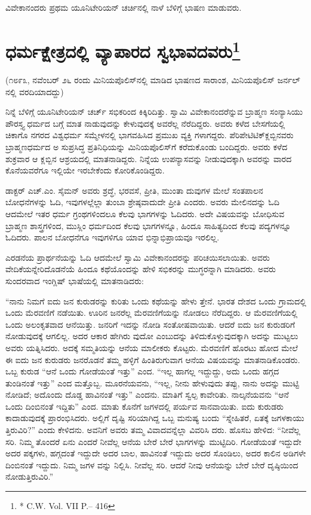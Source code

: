 ವಿವೇಕಾನಂದರು ಪ್ರಥಮ ಯೂನಿಟೇರಿಯನ್​ ಚರ್ಚಿನಲ್ಲಿ ನಾಳೆ ಬೆಳಿಗ್ಗೆ ಭಾಷಣ ಮಾಡುವರು.

\delimiter


\section{ಧರ್ಮಕ್ಷೇತ್ರದಲ್ಲಿ ವ್ಯಾಪಾರದ ಸ್ವಭಾವದವರು\protect\footnote{* C.W. Vol. VII P.– 416}}

(೧೮೯೩, ನವೆಂಬರ್​ ೨೬ ರಂದು ಮಿನಿಯಪೊಲಿಸ್​ನಲ್ಲಿ ಮಾಡಿದ ಭಾಷಣದ ಸಾರಾಂಶ, ಮಿನಿಯಪೊಲಿಸ್​ ಜರ್ನಲ್​ನಲ್ಲಿ ವರದಿಯಾದದ್ದು)

ನಿನ್ನೆ ಬೆಳಿಗ್ಗೆ ಯೂನಿಟೇರಿಯನ್​ ಚರ್ಚ್​ ಸಭಿಕರಿಂದ ಕಿಕ್ಕಿರಿದಿತ್ತು. ಸ್ವಾಮಿ ವಿವೇಕಾನಂದರೆನ್ನುವ ಬ್ರಾಹ್ಮಣ ಸಂನ್ಯಾಸಿಯು ಪೌರಸ್ತ್ಯ ಧರ್ಮದ ಬಗ್ಗೆ ಮಾತ ನಾಡುವುದನ್ನು ಕೇಳುವುದಕ್ಕೆ ಅವರೆಲ್ಲ ನೆರೆದಿದ್ದರು. ಅವರು ಕಳೆದ ಬೇಸಗೆಯಲ್ಲಿ ಚಿಕಾಗೊ ನಗರದ ವಿಶ್ವಧರ್ಮ ಸಮ್ಮೇಳನಲ್ಲಿ ಭಾಗವಹಿಸಿದ ಪ್ರಮುಖ ವ್ಯಕ್ತಿ ಗಳಾಗದ್ದರು. ಪೆರಿಪೇಟಿಟಿಕ್​ ಕ್ಲಬ್ಬಿನವರು ಬ್ರಾಹ್ಮಣಧರ್ಮದ ಅ ಸುಪ್ರಸಿದ್ಧ ಪ್ರತಿನಿಧಿಯನ್ನು ಮಿನಿಯಪೊಲಿಸ್​ಗೆ ಕರೆದುಕೊಂಡು ಬಂದಿದ್ದರು. ಅವರು ಕಳೆದ ಶುಕ್ರವಾರ ಆ ಕ್ಲಬ್ಬಿನ ಆಶ್ರಯದಲ್ಲಿ ಮಾತನಾಡಿದ್ದರು. ನಿನ್ನೆಯ ಉಪನ್ಯಾಸವನ್ನು ನೀಡುವುದಕ್ಕಾಗಿ ಅವರನ್ನು ವಾರದ ಕೊನೆಯವರೆಗೂ ಇಲ್ಲಿಯೇ ಇರಬೇಕೆಂದು ಕೋರಿಕೊಂಡಿದ್ದರು.

ಡಾಕ್ಟರ್​ ಎಚ್​.ಎಂ. ಸೈಮನ್​ ಅವರು ಶ್ರದ್ಧೆ, ಭರವಸೆ, ಪ್ರೀತಿ, ಮುಂತಾ ದುವುಗಳ ಮೇಲೆ ಸಂತಪಾಲನ ಬೋಧನೆಗಳನ್ನು ಓದಿ, ಇವುಗಳಲ್ಲೆಲ್ಲಾ ತುಂಬಾ ಶ್ರೇಷ್ಠವಾದುದೇ ಪ್ರೀತಿ ಎಂದರು. ಅವರು ಮೇಲಿನದನ್ನು ಓದಿ ಆದಮೇಲೆ ಇತರ ಧರ್ಮ ಗ್ರಂಥಗಳಿಂದಲೂ ಕೆಲವು ಭಾಗಗಳನ್ನು ಓದಿದರು. ಅದೇ ವಿಷಯವನ್ನು ಬೋಧಿಸುವ ಬ್ರಾಹ್ಮಣ ಶಾಸ್ತ್ರಗಳಿಂದ, ಮುಸ್ಲಿಂ ಧರ್ಮದಿಂದ ಕೆಲವು ಭಾಗಗಳನ್ನೂ, ಹಿಂದೂ ಸಾಹಿತ್ಯದಿಂದ ಕೆಲವು ಪದ್ಯಗಳನ್ನೂ ಓದಿದರು. ಪಾಲನ ಬೋಧನೆಗೂ ಇವುಗಳಿಗೂ ಯಾವ ಭಿನ್ನಾಭಿಪ್ರಾಯವೂ ಇರಲಿಲ್ಲ.

ಎರಡನೆಯ ಪ್ರಾರ್ಥನೆಯನ್ನು ಓದಿ ಆದಮೇಲೆ ಸ್ವಾಮಿ ವಿವೇಕಾನಂದರನ್ನು ಪರಿಚಯಿಸಲಾಯಿತು. ಅವರು ವೇದಿಕೆಯನ್ನೇರಿದೊಡನೆಯೆ ಹಿಂದೂ ಕಥೆಯೊಂದನ್ನು ಹೇಳಿ ಸಭಿಕರನ್ನು ಮುಗ್ಧರನ್ನಾಗಿ ಮಾಡಿದರು. ಅವರು ಸುಂದರವಾದ ಇಂಗ್ಲಿಷ್​ ಭಾಷೆಯಲ್ಲಿ ಮಾತನಾಡಿದರು:

“ನಾನು ನಿಮಗೆ ಐದು ಜನ ಕುರುಡರನ್ನು ಕುರಿತು ಒಂದು ಕಥೆಯನ್ನು ಹೇಳು ತ್ತೇನೆ. ಭಾರತ ದೇಶದ ಒಂದು ಗ್ರಾಮದಲ್ಲಿ ಒಂದು ಮೆರವಣಿಗೆ ನಡೆಯಿತು. ಊರಿನ ಜನರೆಲ್ಲ ಮೆರವಣಿಗೆಯನ್ನು ನೋಡಲು ನೆರೆದಿದ್ದರು. ಆ ಮೆರವಣಿಗೆಯಲ್ಲಿ ಒಂದು ಅಲಂಕೃತವಾದ ಆನೆಯಿತ್ತು. ಜನರಿಗೆ ಇದನ್ನು ನೋಡಿ ಸಂತೋಷವಾಯಿತು. ಆದರೆ ಐದು ಜನ ಕುರುಡರಿಗೆ ನೋಡುವುದಕ್ಕೆ ಆಗಲಿಲ್ಲ. ಅದರ ಆಕಾರ ಹೇಗಿರು ವುದೋ ಎಂಬುದನ್ನು ತಿಳಿದುಕೊಳ್ಳುವುದಕ್ಕಾಗಿ ಅದನ್ನು ಮುಟ್ಟಲು ಅವರು ಯತ್ನಿಸಿದರು. ಅದಕ್ಕೆ ಸಮ್ಮತಿಯನ್ನು ಆನೆಯ ಮಾಲೀಕರು ಕೊಟ್ಟರು. ಮೆರವಣಿಗೆ ಹೊರಟು ಹೋದ ಮೇಲೆ ಈ ಐದು ಜನ ಕುರುಡರು ಜನರೊಡನೆ ತಮ್ಮ ಹಳ್ಳಿಗೆ ಹಿಂತಿರುಗುವಾಗ ಆನೆಯ ವಿಷಯವನ್ನು ಮಾತನಾಡಿಕೊಂಡರು. ಒಬ್ಬ ಕುರುಡ “ಆನೆ ಒಂದು ಗೋಡೆಯಂತೆ ಇತ್ತು” ಎಂದ. “ಇಲ್ಲ ಹಾಗಲ್ಲ ಇದ್ದುದ್ದು, ಅದು ಒಂದು ಹಗ್ಗದ ತುಂಡಿನಂತೆ ಇತ್ತು” ಎಂದ ಮತ್ತೊಬ್ಬ. ಮೂರನೆಯವನು, “ಇಲ್ಲ, ನೀನು ಹೇಳುವುದು ತಪ್ಪು, ನಾನು ಅದನ್ನು ಮುಟ್ಟಿ ನೋಡಿದೆ; ಅದೊಂದು ದೊಡ್ಡ ಹಾವಿನಂತೆ ಇತ್ತು” ಎಂದನು. ಮಾತಿಗೆ ಸ್ವಲ್ಪ ಕಾವೇರಿತು. ನಾಲ್ಕನೆಯವನು “ಆನೆ ಒಂದು ದಿಂಬಿನಂತೆ ಇದ್ದಿತು” ಎಂದ. ಮಾತು ಕೊನೆಗೆ ಜಗಳದಲ್ಲಿ ಪರ್ಯವ ಸಾನವಾಯಿತು. ಐದು ಕುರುಡರು ಕಾದಾಡುವುದಕ್ಕೆ ಪ್ರಾರಂಭಿಸಿದರು. ಅಲ್ಲಿಗೆ ದೃಷ್ಟಿ ಸರಿಯಾಗಿದ್ದ ಒಬ್ಬ ಮನುಷ್ಯ ಬಂದು “ಸ್ನೇಹಿತರೆ, ಏತಕ್ಕೆ ಜಗಳಕಾಯು ತ್ತಿರುವಿರಿ?” ಎಂದು ಕೇಳಿದನು. ಅವನಿಗೆ ಅವರು ತಮ್ಮ ವಿವಾದವನ್ನೆಲ್ಲಾ ವಿವರಿಸಿ ದರು. ಹೊಸಬ ಹೇಳಿದ: “ನೀವೆಲ್ಲ ಸರಿ. ನಿಮ್ಮ ತೊಂದರೆ ಏನು ಎಂದರೆ ನೀವೆಲ್ಲ ಆನೆಯ ಬೇರೆ ಬೇರೆ ಭಾಗಗಳನ್ನು ಮುಟ್ಟಿದಿರಿ. ಗೋಡೆಯಂತೆ ಇದ್ದುದೇ ಅದರ ಪಕ್ಕಗಳು, ಹಗ್ಗದಂತೆ ಇದ್ದುದೇ ಅದರ ಬಾಲ, ಹಾವಿನಂತೆ ಇದ್ದುದು ಅದರ ಸೊಂಡಿಲು, ಅದರ ಕಾಲಿನ ಅಡಿಗಳೇ ದಿಂಬಿನಂತೆ ಇದ್ದುದು. ನಿಮ್ಮ ಜಗಳ ವನ್ನು ನಿಲ್ಲಿಸಿ. ನೀವೆಲ್ಲ ಸರಿ. ಆದರೆ ನೀವು ಆನೆಯನ್ನು ಬೇರೆ ಬೇರೆ ದೃಷ್ಠಿಯಿಂದ ನೋಡುತ್ತಿರುವಿರಿ.”

